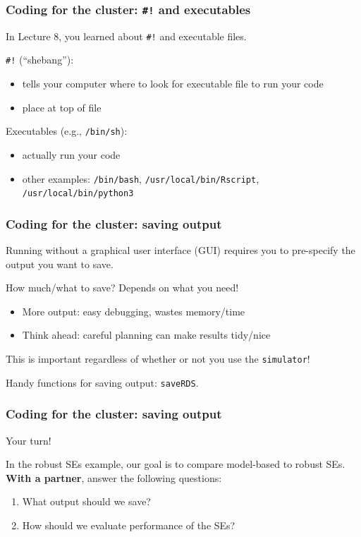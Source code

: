 \documentclass[12pt, 
hyperref={colorlinks=true, linkcolor=BlueViolet, urlcolor=BlueViolet},dvipsnames]{beamer}
\begin{document}
\begin{frame}
\frametitle{Coding for the cluster: \texttt{\#!} and executables}

In Lecture 8, you learned about \texttt{\#!} and executable files. \pause

\texttt{\#!} (``shebang''): \vspace{-0.3cm} \pause
\begin{itemize}
\item tells your computer where to look for executable file to run your code
\item place at top of file \pause
\end{itemize}

Executables (e.g., \texttt{/bin/sh}): \vspace{-0.3cm} \pause
\begin{itemize}
\item actually run your code
\item other examples: \texttt{/bin/bash}, \texttt{/usr/local/bin/Rscript}, \texttt{/usr/local/bin/python3}
\end{itemize}

\end{frame}

\begin{frame}
\frametitle{Coding for the cluster: saving output}

Running without a graphical user interface (GUI) requires you to pre-specify the output you want to save.

How much/what to save? \pause Depends on what you need! \vspace{-0.3cm} \pause
\begin{itemize}
\item More output: easy debugging, wastes memory/time \pause
\item Think ahead: careful planning can make results tidy/nice \pause
\end{itemize}

This is important regardless of whether or not you use the \texttt{simulator}!

Handy functions for saving output: \texttt{saveRDS}.
\end{frame}

\begin{frame}
\frametitle{Coding for the cluster: saving output}

Your turn!

In the robust SEs example, our goal is to compare model-based to robust SEs. \textbf{With a partner}, answer the following questions: \vspace{-0.3cm}
\begin{enumerate}
\item What output should we save?
\item How should we evaluate performance of the SEs? 
\end{enumerate}
\end{frame}
\end{document}
